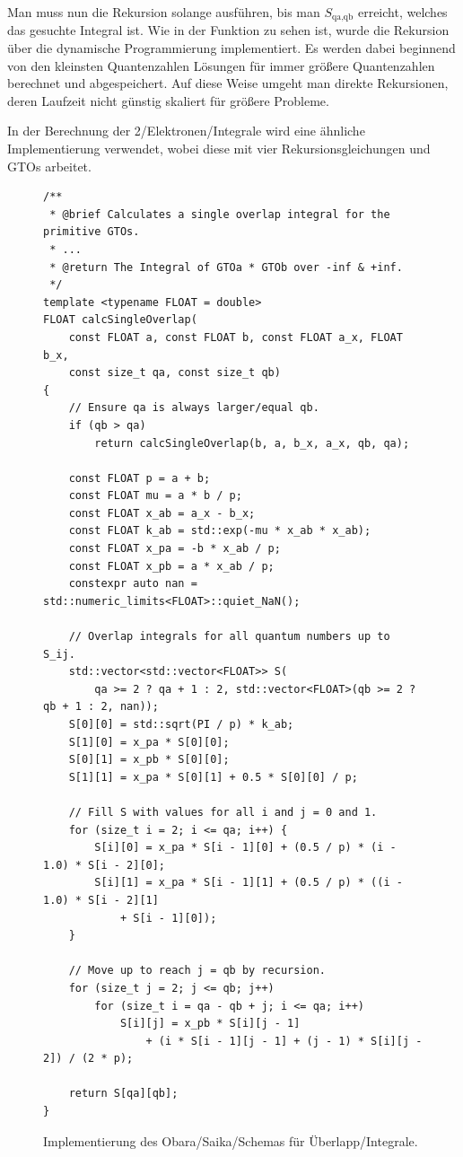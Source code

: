 \cite[9.3.1]{structure_2013}

Man muss nun die Rekursion solange ausführen, bis man $S_\text{qa,qb}$ erreicht,
welches das gesuchte Integral ist.
Wie in der Funktion zu sehen ist, wurde die Rekursion über die dynamische Programmierung implementiert.
Es werden dabei beginnend von den kleinsten Quantenzahlen Lösungen
für immer größere Quantenzahlen berechnet und abgespeichert.
Auf diese Weise umgeht man direkte Rekursionen,
deren Laufzeit nicht günstig skaliert für größere Probleme.

In der Berechnung der 2\-/Elektronen\-/Integrale wird eine ähnliche Implementierung verwendet, wobei diese
mit vier Rekursionsgleichungen und GTOs arbeitet.

\begin{figure}[H]
\begin{verbatim}
/**
 * @brief Calculates a single overlap integral for the primitive GTOs.
 * ...
 * @return The Integral of GTOa * GTOb over -inf & +inf.
 */
template <typename FLOAT = double>
FLOAT calcSingleOverlap(
    const FLOAT a, const FLOAT b, const FLOAT a_x, FLOAT b_x,
    const size_t qa, const size_t qb)
{
    // Ensure qa is always larger/equal qb.
    if (qb > qa)
        return calcSingleOverlap(b, a, b_x, a_x, qb, qa);

    const FLOAT p = a + b;
    const FLOAT mu = a * b / p;
    const FLOAT x_ab = a_x - b_x;
    const FLOAT k_ab = std::exp(-mu * x_ab * x_ab);
    const FLOAT x_pa = -b * x_ab / p;
    const FLOAT x_pb = a * x_ab / p;
    constexpr auto nan = std::numeric_limits<FLOAT>::quiet_NaN();

    // Overlap integrals for all quantum numbers up to S_ij.
    std::vector<std::vector<FLOAT>> S(
        qa >= 2 ? qa + 1 : 2, std::vector<FLOAT>(qb >= 2 ? qb + 1 : 2, nan));
    S[0][0] = std::sqrt(PI / p) * k_ab;
    S[1][0] = x_pa * S[0][0];
    S[0][1] = x_pb * S[0][0];
    S[1][1] = x_pa * S[0][1] + 0.5 * S[0][0] / p;

    // Fill S with values for all i and j = 0 and 1.
    for (size_t i = 2; i <= qa; i++) {
        S[i][0] = x_pa * S[i - 1][0] + (0.5 / p) * (i - 1.0) * S[i - 2][0];
        S[i][1] = x_pa * S[i - 1][1] + (0.5 / p) * ((i - 1.0) * S[i - 2][1]
            + S[i - 1][0]);
    }

    // Move up to reach j = qb by recursion.
    for (size_t j = 2; j <= qb; j++)
        for (size_t i = qa - qb + j; i <= qa; i++)
            S[i][j] = x_pb * S[i][j - 1]
                + (i * S[i - 1][j - 1] + (j - 1) * S[i][j - 2]) / (2 * p);

    return S[qa][qb];
}
\end{verbatim}
\caption{Implementierung des Obara\-/Saika\-/Schemas für Überlapp\-/Integrale.}
\label{overlap-impl}
\end{figure}

